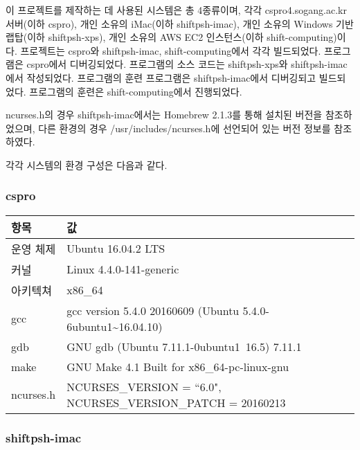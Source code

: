 이 프로젝트를 제작하는 데 사용된 시스템은 총 4종류이며, 각각 cspro4.sogang.ac.kr 서버(이하 cspro), 개인 소유의 iMac(이하 shiftpsh-imac),
개인 소유의 Windows 기반 랩탑(이하 shiftpsh-xps), 개인 소유의 AWS EC2 인스턴스(이하 shift-computing)이다.
프로젝트는 cspro와 shiftpsh-imac, shift-computing에서 각각 빌드되었다. 프로그램은 cspro에서 디버깅되었다. 프로그램의 소스 코드는 shiftpsh-xps와 shiftpsh-imac에서 작성되었다.
프로그램의 훈련 프로그램은 shiftpsh-imac에서 디버깅되고 빌드되었다. 프로그램의 훈련은 shift-computing에서 진행되었다.

ncurses.h의 경우 shiftpsh-imac에서는 Homebrew 2.1.3를 통해 설치된 버전을 참조하었으며, 다른 환경의 경우 /usr/includes/ncurses.h에 선언되어 있는 버전 정보를 참조하였다.

각각 시스템의 환경 구성은 다음과 같다.

\subsubsection{cspro}\hfill

\begin{tabularx}{\linewidth}{l|X}
    항목 & 값 \\
    \hline
    운영 체제 & Ubuntu 16.04.2 LTS \\
    커널 & Linux 4.4.0-141-generic \\
    아키텍쳐 & x86_64 \\
    \hline
    gcc & gcc version 5.4.0 20160609 (Ubuntu 5.4.0-6ubuntu1\textasciitilde{}16.04.10) \\
    gdb & GNU gdb (Ubuntu 7.11.1-0ubuntu1~16.5) 7.11.1 \\
    make & GNU Make 4.1 Built for x86_64-pc-linux-gnu \\
    \hline
    ncurses.h & NCURSES_VERSION = ``6.0", NCURSES_VERSION_PATCH = 20160213 \\
\end{tabularx}

\newpage

\subsubsection{shiftpsh-imac}\hfill

